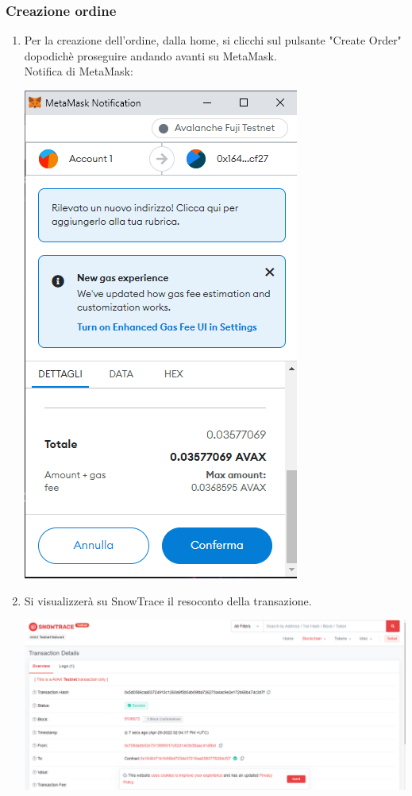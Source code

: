 \subsubsection{Creazione ordine}
\begin{enumerate}
    \item Per la creazione dell'ordine, dalla home, si clicchi sul pulsante "Create Order" dopodichè proseguire andando avanti su MetaMask.\\
    Notifica di MetaMask:\\
    \begin{center}
    \includegraphics[scale = 0.35]{img/NotificaCrea Ordine.PNG}
    \end{center}
    
    \item Si visualizzerà su SnowTrace il resoconto della transazione.
    \begin{center}
    \includegraphics[scale = 0.35]{img/snowtrace.PNG}
    \end{center}
    

\end{enumerate}
